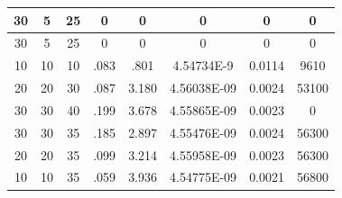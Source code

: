 \documentclass{article}
\begin{document}
\begin{table}
\begin{center}
\begin{tabular}{|c|c|c|c|c|c|c|c|}
30 &  5 & 25 & 0 & 0 & 0  & 0 & 0 \\ \hline
30 &  5 & 25 & 0 & 0 & 0  & 0 & 0 \\ \hline

10 & 10 & 10 & .083 & .801 & 4.54734E-9  & 0.0114 & 9610 \\ \hline
20 & 20 & 30 & .087 & 3.180 & 4.56038E-09  & 0.0024 & 53100 \\ \hline
30 & 30 & 40 & .199 & 3.678 & 4.55865E-09  & 0.0023 & 0 \\ \hline
30 & 30 & 35 & .185 & 2.897 & 4.55476E-09  & 0.0024 & 56300 \\ \hline
20 & 20 & 35 & .099 & 3.214 & 4.55958E-09  & 0.0023 & 56300 \\ \hline
10 & 10 & 35 & .059 & 3.936 & 4.54775E-09  & 0.0021 & 56800 \\ \hline
\end{tabular}
\end{center}
\end{table}



{}

\end{document}
